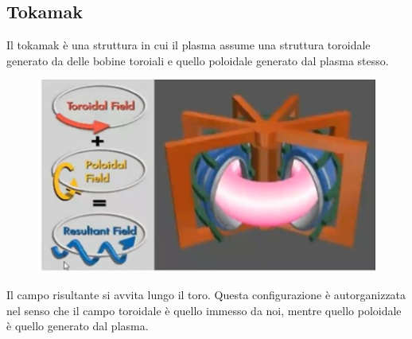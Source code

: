 \documentclass{article}
\begin{document}
\subsection{Tokamak}
Il tokamak è una struttura in cui il plasma assume una struttura toroidale generato da delle bobine toroiali e quello poloidale generato dal plasma stesso.
\begin{center}
    \begin{figure}
        \centering
        \includegraphics[scale=0.4]{2022-06-26-14-53-25.png}%
    \end{figure}
\end{center}
Il campo risultante si avvita lungo il toro. Questa configurazione è autorganizzata nel senso che il campo toroidale è quello immesso da noi, mentre quello poloidale è quello generato dal plasma.
\end{document}
